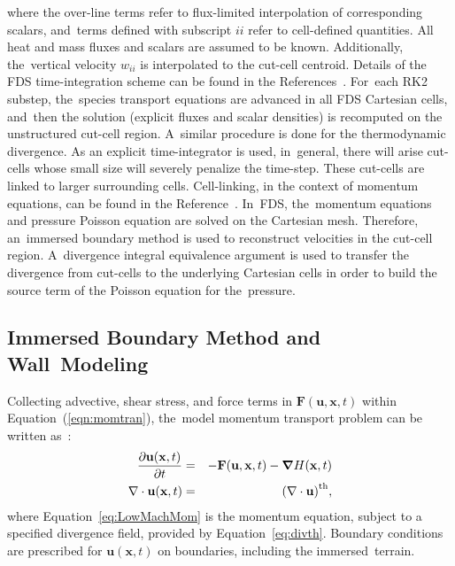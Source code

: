 \documentclass[atmosphere,article,accept,moreauthors,pdftex]{Definitions/mdpi}
\begin{document}
\begin{paracol}{2}
\switchcolumn

\noindent where the over-line terms refer to flux-limited interpolation of corresponding scalars, and~terms defined with subscript $ii$ refer to cell-defined quantities. All heat and mass fluxes and scalars are assumed to be known. Additionally, the~vertical velocity $w_{ii}$ is interpolated to the cut-cell centroid. Details of the FDS time-integration scheme can be found in the References~\cite{FDS_Users_Guide,mcdermo_2014}. For~each RK2 substep, the~species transport equations are advanced in all FDS Cartesian cells, and~then the solution (explicit fluxes and scalar densities) is recomputed on the unstructured cut-cell region. A~similar procedure is done for the thermodynamic divergence.
As an explicit time-integrator is used, in~general, there will arise cut-cells whose small size will severely penalize the time-step. These cut-cells are linked to larger surrounding cells. Cell-linking, in the context of momentum equations, can be found in the Reference~\cite{kirk_2003}. In~FDS, the~momentum equations and pressure Poisson equation are solved on the Cartesian mesh. Therefore, an~immersed boundary method is used to reconstruct velocities in the cut-cell region. A~divergence integral equivalence argument is used to transfer the divergence from cut-cells to the underlying Cartesian cells in order to build the source term of the Poisson equation for the~pressure.


\subsection{Immersed Boundary Method and Wall~Modeling}

Collecting advective, shear stress, and force terms in $\mathbf{F}(\mathbf{u},\mathbf{x},t)$ within Equation~(\ref{eqn:momtran}), the~model momentum transport problem can be written as~\cite{FDS_Users_Guide}:
\begin{eqnarray}
  \frac{\partial \mathbf{u}(\mathbf{x},t)}{\partial t} &=& - \mathbf{F}(\mathbf{u},\mathbf{x},t) - \boldsymbol{\nabla} H(\mathbf{x},t)  \label{eq:LowMachMom} \\
         \nabla \cdot \mathbf{u} (\mathbf{x},t) & = & \left(\nabla \cdot \mathbf{u} \right)^{\rm th} \label{eq:LowMachDiv},
\end{eqnarray}
where Equation~\eqref{eq:LowMachMom} is the momentum equation, subject to a specified divergence field, provided by Equation~\eqref{eq:divth}.
Boundary conditions are prescribed for $\mathbf{u}(\mathbf{x},t)$ on boundaries, including the immersed~terrain.


\end{paracol}
\end{document}
